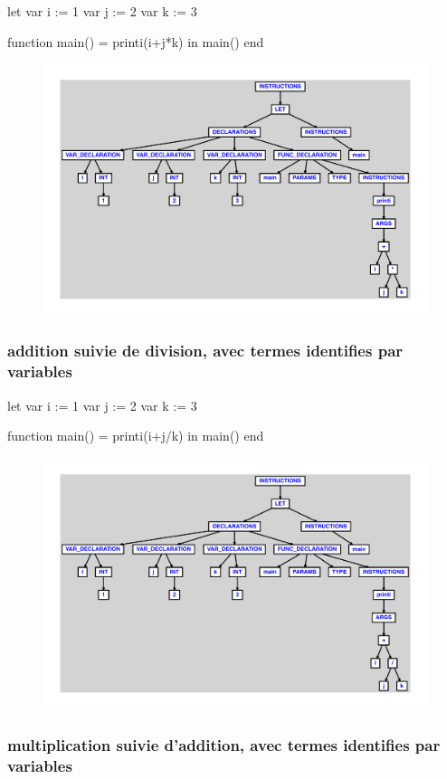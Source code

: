 \documentclass{article}
\begin{document}
\begin{verbatimtab}
let
	var i := 1
	var j := 2
	var k := 3

	function main() = printi(i+j*k)
in main() end
\end{verbatimtab}
\begin{figure}[H]\centering\includegraphics[max width=\textwidth]{ast/ast_57.pdf}\end{figure}\subsubsection{addition suivie de division, avec termes identifies par variables}
\begin{verbatimtab}
let
	var i := 1
	var j := 2
	var k := 3

	function main() = printi(i+j/k)
in main() end
\end{verbatimtab}
\begin{figure}[H]\centering\includegraphics[max width=\textwidth]{ast/ast_58.pdf}\end{figure}\subsubsection{multiplication suivie d'addition, avec termes identifies par variables}
\end{document}
